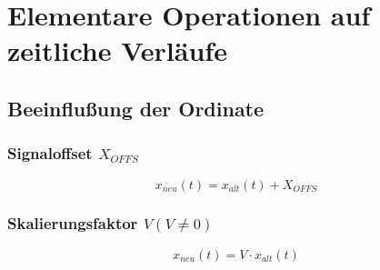 \section{Elementare Operationen auf zeitliche Verläufe}
\subsection{Beeinflußung der Ordinate}

\begin{multicols}{2}
 \subsubsection*{Signaloffset \texorpdfstring{$X_{OFFS}$}{}}
  \begin{equation*}
   x_{neu}\left(t\right) = x_{alt}\left(t\right) + X_{OFFS} 
  \end{equation*}
\vfill
  \begin{center}
  
  \end{center}
\end{multicols}

\begin{multicols}{2}
 \subsubsection*{Skalierungsfaktor \texorpdfstring{$V \left(V \neq 0 \right) $}{}}
  \begin{equation*}
   x_{neu}\left(t\right) = V \cdot x_{alt}\left(t\right) 
  \end{equation*}
\vfill
  \begin{center}
  
  \end{center}
\end{multicols}

